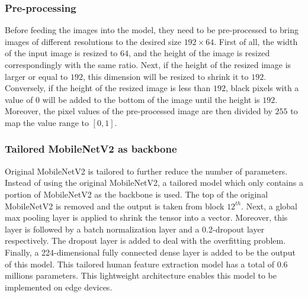 \documentclass[../main.tex]{subfiles}
\begin{document}
\subsubsection{Pre-processing}
\label{subsubsec:deep_preprocess}
Before feeding the images into the model, they need to be pre-processed to bring images of different resolutions to the desired size $192\times64$. First of all, the width of the input image is resized to $64$, and the height of the image is resized correspondingly with the same ratio. Next, if the height of the resized image is larger or equal to $192$, this dimension will be resized to shrink it to $192$. Conversely, if the height of the resized image is less than $192$, black pixels with a value of $0$ will be added to the bottom of the image until the height is $192$. Moreover, the pixel values of the pre-processed image are then divided by $255$ to map the value range to $[0, 1]$.


\subsubsection{Tailored MobileNetV2 as backbone}
Original MobileNetV2 is tailored to further reduce the number of parameters. Instead of using the original MobileNetV2, a tailored model which only contains a portion of MobileNetV2 as the backbone is used. The top of the original MobileNetV2 is removed and the output is taken from block $12^{th}$. Next, a global max pooling layer is applied to shrink the tensor into a vector. Moreover, this layer is followed by a batch normalization layer and a 0.2-dropout layer respectively. The dropout layer is added to deal with the overfitting problem. Finally, a 224-dimensional fully connected dense layer is added to be the output of this model. This tailored human feature extraction model has a total of $0.6$ millions parameters. This lightweight architecture enables this model to be implemented on edge devices.
\end{document}
